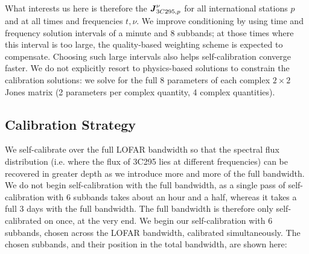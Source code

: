\pg
What interests us here is therefore the $\textbf{\emph{J}}_{3C295,p}^{\nu}$ for all international stations $p$ and at all times and frequencies $t,\nu$. We improve conditioning by using time and frequency solution intervals of a minute and 8 subbands; at those times where this interval is too large, the quality-based weighting scheme is expected to compensate. Choosing such large intervals also helps self-calibration converge faster. We do not explicitly resort to physics-based solutions to constrain the calibration solutions: we solve for the full 8 parameters of each complex $2\times 2$ Jones matrix (2 parameters per complex quantity, 4 complex quantities).



\subsection{Calibration Strategy}

\pg
We self-calibrate over the full LOFAR bandwidth so that the spectral flux distribution (i.e. where the flux of 3C295 lies at different frequencies) can be recovered in greater depth as we introduce more and more of the full bandwidth. We do not begin self-calibration with the full bandwidth, as a single pass of self-calibration with 6 subbands takes about an hour and a half, whereas it takes a full 3 days with the full bandwidth. The full bandwidth is therefore only self-calibrated on once, at the very end. We begin our self-calibration with 6 subbands, chosen across the LOFAR bandwidth, calibrated simultaneously. The chosen subbands, and their position in the total bandwidth, are shown here:
\begin{figure}[h]
\begin{floatrow}
\end{floatrow}
\end{figure}

